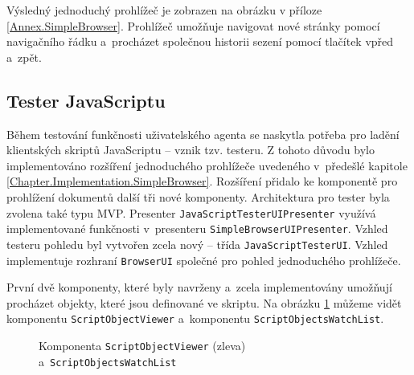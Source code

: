 Výsledný jednoduchý prohlížeč je zobrazen na obrázku v příloze \ref{Annex.SimpleBrowser}. Prohlížeč umožňuje navigovat nové stránky pomocí navigačního řádku a~procházet společnou historii sezení pomocí tlačítek vpřed a~zpět. 

\vspace{-0.3em}

\subsection{Tester JavaScriptu}
\label{Chapter.Implementation.JavaScriptTester}

Během testování funkčnosti uživatelského agenta se naskytla potřeba pro ladění klientských skriptů JavaScriptu -- vznik tzv. testeru. Z tohoto důvodu bylo implementováno rozšíření jednoduchého prohlížeče uvedeného v~předešlé kapitole \ref{Chapter.Implementation.SimpleBrowser}. Rozšíření přidalo ke komponentě pro prohlížení dokumentů další tři nové komponenty. Architektura pro tester byla zvolena také typu MVP. Presenter \texttt{JavaScriptTesterUIPresenter} využívá implementované funkčnosti v~presenteru \texttt{SimpleBrowserUIPresenter}. Vzhled testeru pohledu byl vytvořen zcela nový -- třída \texttt{JavaScriptTesterUI}. Vzhled implementuje rozhraní \texttt{BrowserUI} společné pro pohled jednoduchého prohlížeče.

První dvě komponenty, které byly navrženy a~zcela implementovány umožňují procházet objekty, které jsou definované ve skriptu. Na obrázku \ref{Figure.ScriptObjectViewerAndWatchList} můžeme vidět komponentu \texttt{ScriptObjectViewer} a~komponentu \texttt{ScriptObjectsWatchList}. 

\begin{figure}[H]
  \begin{center}
    \caption{Komponenta \texttt{ScriptObjectViewer} (zleva) a~\texttt{ScriptObjectsWatchList}}
    \label{Figure.ScriptObjectViewerAndWatchList}
  \end{center}
\end{figure}

